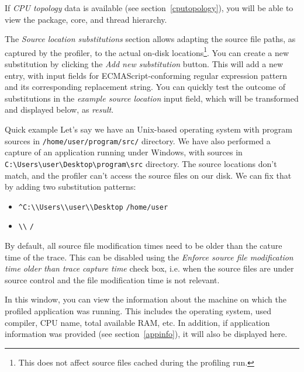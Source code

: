 \documentclass[hidelinks,titlepage,a4paper,twoside]{article}
\begin{document}
If \emph{CPU topology} data is available (see section~\ref{cputopology}), you will be able to view the package, core, and thread hierarchy.

The \emph{Source location substitutions} section allows adapting the source file paths, as captured by the profiler, to the actual on-disk locations\footnote{This does not affect source files cached during the profiling run.}. You can create a new substitution by clicking the \emph{Add new substitution} button. This will add a new entry, with input fields for ECMAScript-conforming regular expression pattern and its corresponding replacement string. You can quickly test the outcome of substitutions in the \emph{example source location} input field, which will be transformed and displayed below, as \emph{result}.

\begin{bclogo}[
noborder=true,
couleur=black!5,
logo=\bclampe
]{Quick example}
Let's say we have an Unix-based operating system with program sources in \texttt{/home/user/program/src/} directory. We have also performed a capture of an application running under Windows, with sources in \texttt{C:\textbackslash{}Users\textbackslash{}user\textbackslash{}Desktop\textbackslash{}program\textbackslash{}src} directory. The source locations don't match, and the profiler can't access the source files on our disk. We can fix that by adding two substitution patterns:

\begin{itemize}
\item \texttt{\^{}C:\textbackslash{}\textbackslash{}Users\textbackslash{}\textbackslash{}user\textbackslash{}\textbackslash{}Desktop} \hspace{1em}\textrightarrow\hspace{1em} \texttt{/home/user}
\item \texttt{\textbackslash{}\textbackslash{}} \hspace{1em}\textrightarrow\hspace{1em} \texttt{/}
\end{itemize}
\end{bclogo}

By default, all source file modification times need to be older than the cature time of the trace. This can be disabled using the \emph{Enforce source file modification time older than trace capture time} check box, i.e. when the source files are under source control and the file modification time is not relevant.

In this window, you can view the information about the machine on which the profiled application was running. This includes the operating system, used compiler, CPU name, total available RAM, etc. In addition, if application information was provided (see section~\ref{appinfo}), it will also be displayed here.
\end{document}
